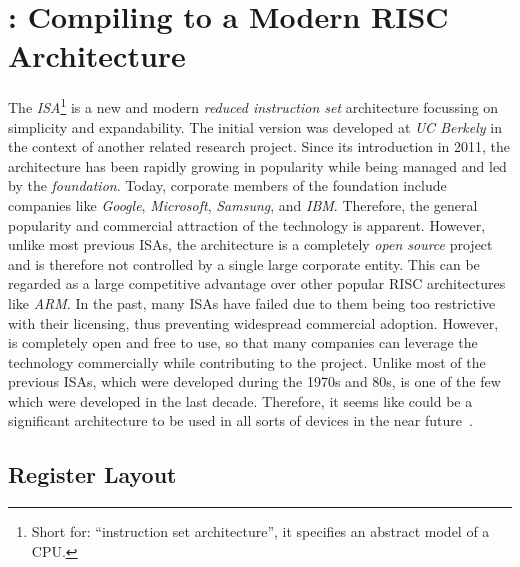 \newpage
\section{\riscv{}: Compiling to a Modern RISC Architecture}

The \emph{\riscv{}} \emph{ISA}\footnote{Short for: \enquote{instruction set architecture}, it specifies an abstract model of a CPU.} is a new and modern \emph{reduced instruction set} architecture focussing on simplicity and expandability.
The initial version was developed at \emph{UC Berkely} in the context of another related research project.
Since its introduction in 2011, the architecture has been rapidly growing in popularity while being managed and led by the \emph{\riscv{} foundation}.
Today, corporate members of the \riscv{} foundation include companies like \emph{Google}, \emph{Microsoft}, \emph{Samsung}, and \emph{IBM}.
Therefore, the general popularity and commercial attraction of the technology is apparent.
However, unlike most previous ISAs, the \riscv{} architecture is a completely \emph{open source} project and is therefore not controlled by a single large corporate entity.
This can be regarded as a large competitive advantage over other popular RISC architectures like \emph{ARM}.
In the past, many ISAs have failed due to them being too restrictive with their licensing, thus preventing widespread commercial adoption.
However, \riscv{} is completely open and free to use, so that many companies can leverage the technology commercially while contributing to the project.
Unlike most of the previous ISAs, which were developed during the 1970s and 80s, \riscv{} is one of the few which were developed in the last decade.
Therefore, it seems like \riscv{} could be a significant architecture to be used in all sorts of devices in the near future~\cite[preface]{Patterson2017}.

\subsection{Register Layout}

